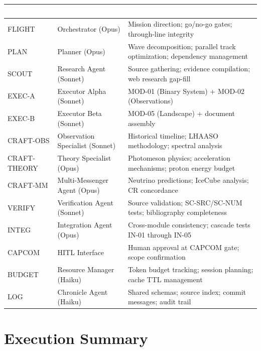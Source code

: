 \documentclass[11pt,letterpaper]{article}
\newcommand{\tableheader}[1]{\textbf{\sffamily\textcolor{white}{#1}}}
\begin{document}
\begin{center}
\begin{tabularx}{\textwidth}{L{2cm}L{3.5cm}X}
\toprule
{}
\tableheader{Role} & \tableheader{Agent} & \tableheader{Responsibility} \\
\midrule
FLIGHT & Orchestrator (Opus) & Mission direction; go/no-go gates; through-line integrity \\
PLAN & Planner (Opus) & Wave decomposition; parallel track optimization; dependency management \\
SCOUT & Research Agent (Sonnet) & Source gathering; evidence compilation; web research gap-fill \\
EXEC-A & Executor Alpha (Sonnet) & MOD-01 (Binary System) + MOD-02 (Observations) \\
EXEC-B & Executor Beta (Sonnet) & MOD-05 (Landscape) + document assembly \\
CRAFT-OBS & Observation Specialist (Sonnet) & Historical timeline; LHAASO methodology; spectral analysis \\
CRAFT-THEORY & Theory Specialist (Opus) & Photomeson physics; acceleration mechanisms; proton energy budget \\
CRAFT-MM & Multi-Messenger Agent (Opus) & Neutrino predictions; IceCube analysis; CR concordance \\
VERIFY & Verification Agent (Sonnet) & Source validation; SC-SRC/SC-NUM tests; bibliography completeness \\
INTEG & Integration Agent (Opus) & Cross-module consistency; cascade tests IN-01 through IN-05 \\
CAPCOM & HITL Interface & Human approval at CAPCOM gate; scope confirmation \\
BUDGET & Resource Manager (Haiku) & Token budget tracking; session planning; cache TTL management \\
LOG & Chronicle Agent (Haiku) & Shared schemas; source index; commit messages; audit trail \\
\bottomrule
\end{tabularx}
\end{center}

\section{Execution Summary}
\end{document}
